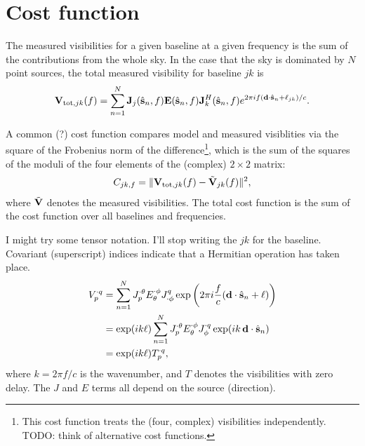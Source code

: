 \documentclass{book}
\newcommand{\shat}{\hat{\bf s}}
\begin{document}
\section{Cost function}

The measured visibilities for a given baseline at a given frequency is the sum of the contributions from the whole sky.
In the case that the sky is dominated by $N$ point sources, the total measured visibility for baseline $jk$ is
\begin{equation}
    {\bf V}_{\text{tot},jk}(f) = \sum_{n=1}^N {\bf J}_j(\shat_n, f){\bf E}(\shat_n, f){\bf J}_k^H(\shat_n, f) e^{2\pi i f ({\bf d}\cdot\shat_n + \ell_{jk})/c}.
\end{equation}

A common (?) cost function compares model and measured visiblities via the square of the Frobenius norm of the difference\footnote{This cost function treats the (four, complex) visibilities independently. TODO: think of alternative cost functions.}, which is the sum of the squares of the moduli of the four elements of the (complex) $2\times2$ matrix:
\begin{equation}
    C_{jk,f} = \lVert {\bf V}_{\text{tot},jk}(f) - \tilde{\bf V}_{jk}(f) \rVert^2,
\end{equation}
where $\tilde{\bf V}$ denotes the measured visibilities.
The total cost function is the sum of the cost function over all baselines and frequencies.

I might try some tensor notation.
I'll stop writing the $jk$ for the baseline.
Covariant (superscript) indices indicate that a Hermitian operation has taken place.
\begin{equation}
\begin{aligned}
    V_p^{\cdot q}
        &= \sum_{n=1}^N J_p^{\cdot \theta} E_\theta^{\cdot \phi} J^q_{\cdot \phi} \exp \left(2\pi i \frac{f}{c} ({\bf d}\cdot\shat_n + \ell)\right) \\
        &= \exp(ik\ell) \sum_{n=1}^N J_p^{\cdot \theta} E_\theta^{\cdot \phi} J_\phi^{\cdot q} \exp (ik \, {\bf d}\cdot\shat_n) \\
        &= \exp(ik\ell) T_p^{\cdot q},
\end{aligned}
\end{equation}
where $k = 2\pi f/c$ is the wavenumber, and $T$ denotes the visibilities with zero delay.
The $J$ and $E$ terms all depend on the source (direction).
\end{document}
